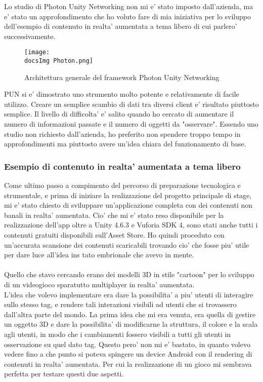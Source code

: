 Lo studio di Photon Unity Networking non mi e' stato imposto dall'azienda, ma e' stato un approfondimento che ho voluto fare di mia iniziativa per lo sviluppo dell'esempio di contenuto in realta' aumentata a tema libero di cui parlero' successivamente.

\begin{figure}[H]
	\centering
	\texttt{[image: \\docsImg Photon.png]}
	\caption{Architettura generale del framework Photon Unity Networking}
	\label{fig:Architettura generale del framework Photon Unity Networking}
\end{figure}

PUN si e' dimostrato uno strumento molto potente e relativamente di facile utilizzo. Creare un semplice scambio di dati tra diversi client e' risultato piuttosto semplice. Il livello di difficolta' e' salito quando ho cercato di aumentare il numero di informazioni passate e il numero di oggetti da "osservare". Essendo uno studio non richiesto dall'azienda, ho preferito non spendere troppo tempo in approfondimenti ma piuttosto avere un'idea chiara del funzionamento di base.

\subsubsection{Esempio di contenuto in realta' aumentata a tema libero}
Come ultimo passo a compimento del percorso di preparazione tecnologica e strumentale, e prima di iniziare la realizzazione del progetto principale di stage, mi e' stato chiesto di sviluppare un'applicazione completa con dei contenuti non banali in realta' aumentata. Cio' che mi e' stato reso disponibile per la realizzazione dell'app oltre a Unity 4.6.3 e Vuforia SDK 4, sono stati anche tutti i contenuti gratuiti disponibili sull'Asset Store. Ho quindi proceduto con un'accurata scansione dei contenuti scaricabili trovando cio' che fosse piu' utile per dare luce all'idea ins tato embrionale che avevo in mente.\\\\
Quello che stavo cercando erano dei modelli 3D in stile "cartoon" per lo sviluppo di un videogioco sparatutto multiplayer in realta' aumentata.\\
L'idea che volevo implementare era dare la possibilita' a piu' utenti di interagire sullo stesso tag, e rendere tali interazioni visibili ad utenti che si trovassero dall'altra parte del mondo. La prima idea che mi era venuta, era quella di gestire un oggetto 3D e dare la possibilita' di modificarne la struttura, il colore e la scala agli utenti, in modo che i cambiamenti fossero visibili a tutti gli utenti in osservazione su quel dato tag. Questo pero' non mi e' bastato, in quanto volevo vedere fino a che punto si poteva spingere un device Android con il rendering di contenuti in realta' aumentata. Per cui la realizzazione di un gioco mi sembrava perfetta per testare questi due aspetti.\\


